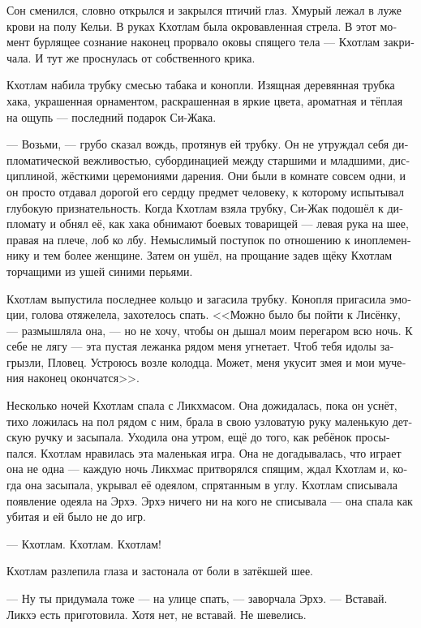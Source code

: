 \documentclass[a4paper,12pt,fleqn]{book}\usepackage{cooltooltips}\usepackage{polyglossia}\setdefaultlanguage[babelshorthands=true]{russian}\setotherlanguage{english}\defaultfontfeatures{Ligatures=TeX,Mapping=tex-text} \usepackage{xcolor}\definecolor{lightgray}{HTML}{bbbbbb}\color{lightgray}\newcommand{\ml}[3]{\textenglish{\textcolor{black}{#3}} }
\newcommand{\asterism}{\vspace{1em}{\centering\Large\bfseries$\ast~\ast~\ast$\par}\vspace{1em}}
\begin{document}
Сон сменился, словно открылся и закрылся птичий глаз.
Хмурый лежал в луже крови на полу Кельи.
В руках Кхотлам была окровавленная стрела.
В этот момент бурлящее сознание наконец прорвало оковы спящего тела --- Кхотлам закричала.
И тут же проснулась от собственного крика.

Кхотлам набила трубку смесью табака и конопли.
Изящная деревянная трубка хака, украшенная орнаментом, раскрашенная в яркие цвета, ароматная и тёплая на ощупь --- последний подарок Си-Жака.

--- Возьми, --- грубо сказал вождь, протянув ей трубку.
Он не утруждал себя дипломатической вежливостью, субординацией между старшими и младшими, дисциплиной, жёсткими церемониями дарения.
Они были в комнате совсем одни, и он просто отдавал дорогой его сердцу предмет человеку, к которому испытывал глубокую признательность.
Когда Кхотлам взяла трубку, Си-Жак подошёл к дипломату и обнял её, как хака обнимают боевых товарищей --- левая рука на шее, правая на плече, лоб ко лбу.
Немыслимый поступок по отношению к иноплеменнику и тем более женщине.
Затем он ушёл, на прощание задев щёку Кхотлам торчащими из ушей синими перьями.

Кхотлам выпустила последнее кольцо и загасила трубку.
Конопля пригасила эмоции, голова отяжелела, захотелось спать.
<<Можно было бы пойти к Лисёнку, --- размышляла она, --- но не хочу, чтобы он дышал моим перегаром всю ночь.
К себе не лягу --- эта пустая лежанка рядом меня угнетает.
Чтоб тебя идолы загрызли, Пловец.
Устроюсь возле колодца.
Может, меня укусит змея и мои мучения наконец окончатся>>.

Несколько ночей Кхотлам спала с Ликхмасом.
Она дожидалась, пока он уснёт, тихо ложилась на пол рядом с ним, брала в свою узловатую руку маленькую детскую ручку и засыпала.
Уходила она утром, ещё до того, как ребёнок просыпался.
Кхотлам нравилась эта маленькая игра.
Она не догадывалась, что играет она не одна --- каждую ночь Ликхмас притворялся спящим, ждал Кхотлам и, когда она засыпала, укрывал её одеялом, спрятанным в углу.
Кхотлам списывала появление одеяла на Эрхэ.
Эрхэ ничего ни на кого не списывала --- она спала как убитая и ей было не до игр.

\asterism

--- Кхотлам.
Кхотлам.
Кхотлам!

Кхотлам разлепила глаза и застонала от боли в затёкшей шее.

--- Ну ты придумала тоже --- на улице спать, --- заворчала Эрхэ.
--- Вставай.
Ликхэ есть приготовила.
Хотя нет, не вставай.
Не шевелись.
\end{document}
